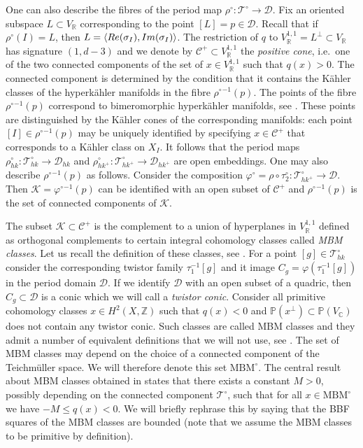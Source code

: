 \documentclass[11pt]{article}
\newcommand{\6}{\partial}
\newcommand{\bbZ}{\mathbb{Z}}
\newcommand{\bbR}{\mathbb{R}}
\newcommand{\bbC}{\mathbb{C}}
\newcommand{\bbP}{\mathbb{P}}
\newcommand{\CC}{\mathcal{C}}
\newcommand{\KK}{\mathcal{K}}
\renewcommand{\le}{\leqslant}
\newcommand{\Teich}{\mathcal{T}}
\newcommand{\TeichHK}{\Teich_{h\!k}}
\newcommand{\TeichHKa}{\Teich_{h\!k^+}}
\newcommand{\Dom}{\mathcal{D}}
\newcommand{\DomHK}{\Dom_{h\!k}}
\newcommand{\DomHKa}{\Dom_{h\!k^+}}
\newcommand{\Per}{\rho}
\newcommand{\PerHK}{\Per_{h\!k}}
\newcommand{\PerHKa}{\Per_{h\!k^+}}
\newcommand{\MBM}{\mathrm{MBM}}
\begin{document}
One can also describe the fibres of the period map $\Per^\circ\colon \Teich^\circ\to \Dom$. Fix an oriented subspace $L\subset V_\bbR$
corresponding to the point $[L] = p\in \Dom$. Recall that if $\rho^\circ(I) = L$, then $L=\langle{\rm Re}(\sigma_I), {\rm Im}(\sigma_I)\rangle$. The restriction of $q$ to $V^{1,1}_\bbR = L^\perp\subset V_\bbR$
has signature $(1,d-3)$ and we denote by $\CC^+\subset V^{1,1}_\bbR$ the {\it positive cone}, i.e.\ one
of the two connected components of the set of $x\in V^{1,1}_\bbR$
such that $q(x)>0$. The connected component is determined by the condition that it contains the K\"ahler classes
of the hyperk\"ahler manifolds in the fibre ${\Per^\circ}^{-1}(p)$. 
The points of the fibre ${\Per^\circ}^{-1}(p)$ correspond to bimeromorphic hyperk\"ahler manifolds, see \cite[Theorem 4.3]{Hu}. These points
are distinguished by the K\"ahler cones of the corresponding
manifolds: each point $[I] \in{\Per^\circ}^{-1}(p)$ may be uniquely identified by specifying
$x\in \CC^+$ that corresponds to a K\"ahler class on $X_I$. It follows that
the period maps $\PerHK^\circ\colon \TeichHK^\circ \to\DomHK$ and $\PerHKa^\circ\colon \TeichHKa^\circ\to \DomHKa$
are open embeddings. One may also describe ${\Per^\circ}^{-1}(p)$ as follows.
Consider the composition $\varphi^\circ = \rho\circ \tau_2^\circ\colon \TeichHKa^\circ\to \Dom$.
Then $\KK = {\varphi^\circ}^{-1}(p)$ can be identified with an open subset of $\CC^+$ and ${\Per^\circ}^{-1}(p)$ is
the set of connected components of $\KK$. 

The subset $\KK\subset \CC^+$ is the complement to a union of hyperplanes in $V^{1,1}_\bbR$
defined as orthogonal complements to certain integral cohomology classes called {\it MBM classes}. Let us recall
the definition of these classes, see \cite{AV1}. For a point $[g]\in \TeichHK^\circ$
consider the corresponding twistor family $\tau_1^{-1}[g]$ and it image $C_g = \varphi(\tau_1^{-1}[g])$
in the period domain $\Dom$. If we identify $\Dom$ with an open subset of a quadric, then
$C_g\subset \Dom$ is a conic which we will call a {\it twistor conic}. Consider all primitive cohomology
classes $x\in H^2(X,\bbZ)$ such that $q(x) < 0$ and $\bbP(x^\perp) \subset \bbP(V_\bbC)$ does
not contain any twistor conic. Such classes are called MBM classes and they admit a number
of equivalent definitions that we will not use, see \cite{AV1}. The set of MBM classes may
depend on the choice of a connected component of the Teichm\"uller space. We will therefore
denote this set $\MBM^\circ$. The central result about MBM classes obtained in \cite[Corollary 5.2]{AV4}
states that there exists a constant $M>0$, possibly depending on the connected component $\Teich^\circ$,
such that for all $x\in\MBM^\circ$ we have $-M\le q(x)<0$. We will briefly rephrase
this by saying that the BBF squares of the MBM classes are bounded (note that we assume the MBM
classes to be primitive by definition).
\end{document}
